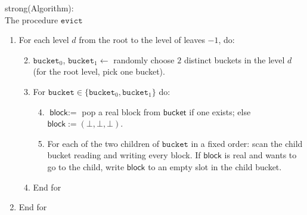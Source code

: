\begin{algo}
\label{alg:evict}
strong(Algorithm):\\
The procedure \(\texttt{evict}\)

\begin{enumerate}
\item
  For each level \(d\) from the root to the level of leaves \(- 1\), do:

  \begin{enumerate}
  \setcounter{enumii}{1}
  \item
    \(\texttt{bucket}_{0}\),
    \(\texttt{bucket}_{1} \leftarrow\) randomly choose \(2\)
    distinct buckets in the level \(d\) (for the root level, pick one
    bucket).
  \item
    For
    \(\texttt{bucket} \in \{\texttt{bucket}_{0},\texttt{bucket}_{1}\}\)
    do:

    \begin{enumerate}
    \setcounter{enumiii}{3}
    \item
      \(\textsf{block} :=\) pop a real block from
      \(\textsf{bucket}\) if one exists; else
      \(\textsf{block} := (\bot,\bot,\bot)\).
    \item
      For each of the two children of \(\texttt{bucket}\) in a
      fixed order: scan the child bucket reading and writing every
      block. If \(\textsf{block}\) is real and wants to go to the
      child, write \(\textsf{block}\) to an empty slot in the
      child bucket.
    \end{enumerate}
  \item
    End for
  \end{enumerate}
\item
  End for
\end{enumerate}
\end{algo}
\fi
